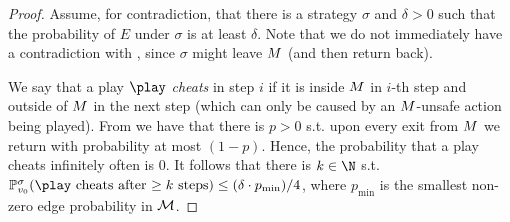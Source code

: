 \begin{proof}
%

 Assume, for contradiction, that there is a strategy $\sigma$ and $\delta > 0$ such that the probability of $E$ under $ \sigma  $ is at least $\delta$. Note that we do not immediately have a contradiction with , since $\sigma$ might leave $M$ (and then return back). 
 
 We say that a play $ \play $ \emph{cheats} in step $ i $ if it is inside $ M $ in $ i $-th step and outside of $ M $ in the next step (which can only be caused by an $ M $-unsafe action being played). From  we have that there is $ p>0 $ s.t. upon every exit from $ M $ we return with probability at most $ (1-p) $. Hence, the probability that a play cheats infinitely often is $ 0 $. It follows that there is $ k\in \N $ s.t. $ \probm_{\vinit}^\sigma(\play \text{ cheats after $\geq k $ steps}) \leq (\delta\cdot p_{\min})/4 $, where $ p_{\min} $ is the smallest non-zero edge probability in $ \mathcal{M} $. 
 

\end{proof}
